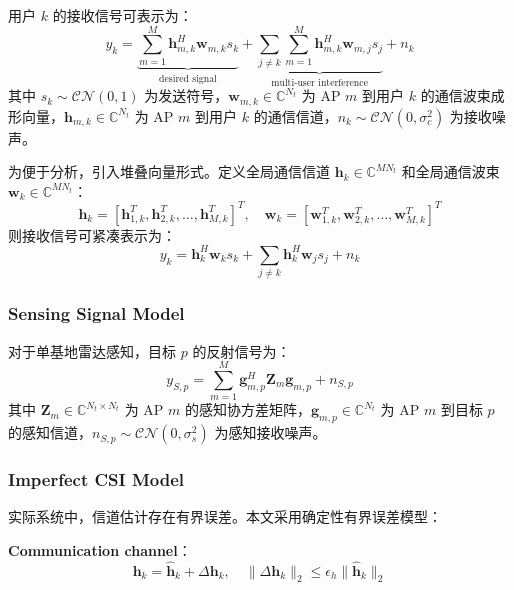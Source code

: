 \documentclass[12pt,a4paper]{article}
\newcommand{\vect}[1]{\mathbf{#1}}
\newcommand{\mat}[1]{\mathbf{#1}}
\newcommand{\norm}[1]{\|#1\|_2}
\begin{document}
用户 $k$ 的接收信号可表示为：
\begin{equation}
y_k = \underbrace{\sum_{m=1}^M \vect{h}_{m,k}^H \vect{w}_{m,k} s_k}_{\text{desired signal}} + \underbrace{\sum_{j \neq k} \sum_{m=1}^M \vect{h}_{m,k}^H \vect{w}_{m,j} s_j}_{\text{multi-user interference}} + n_k
\end{equation}
其中 $s_k \sim \mathcal{CN}(0, 1)$ 为发送符号，$\vect{w}_{m,k} \in \mathbb{C}^{N_t}$ 为 AP $m$ 到用户 $k$ 的通信波束成形向量，$\vect{h}_{m,k} \in \mathbb{C}^{N_t}$ 为 AP $m$ 到用户 $k$ 的通信信道，$n_k \sim \mathcal{CN}(0, \sigma_c^2)$ 为接收噪声。

为便于分析，引入堆叠向量形式。定义全局通信信道 $\vect{h}_k \in \mathbb{C}^{MN_t}$ 和全局通信波束 $\vect{w}_k \in \mathbb{C}^{MN_t}$：
\begin{equation}
\vect{h}_k = [\vect{h}_{1,k}^T, \vect{h}_{2,k}^T, \ldots, \vect{h}_{M,k}^T]^T, \quad
\vect{w}_k = [\vect{w}_{1,k}^T, \vect{w}_{2,k}^T, \ldots, \vect{w}_{M,k}^T]^T
\end{equation}
则接收信号可紧凑表示为：
\begin{equation}
y_k = \vect{h}_k^H \vect{w}_k s_k + \sum_{j \neq k} \vect{h}_k^H \vect{w}_j s_j + n_k
\end{equation}

\subsubsection{Sensing Signal Model}

对于单基地雷达感知，目标 $p$ 的反射信号为：
\begin{equation}
y_{S,p} = \sum_{m=1}^M \vect{g}_{m,p}^H \mat{Z}_m \vect{g}_{m,p} + n_{S,p}
\end{equation}
其中 $\mat{Z}_m \in \mathbb{C}^{N_t \times N_t}$ 为 AP $m$ 的感知协方差矩阵，$\vect{g}_{m,p} \in \mathbb{C}^{N_t}$ 为 AP $m$ 到目标 $p$ 的感知信道，$n_{S,p} \sim \mathcal{CN}(0, \sigma_s^2)$ 为感知接收噪声。

\subsubsection{Imperfect CSI Model}

实际系统中，信道估计存在有界误差。本文采用确定性有界误差模型：

\textbf{Communication channel}：
\begin{equation}
\vect{h}_k = \hat{\vect{h}}_k + \Delta\vect{h}_k, \quad \norm{\Delta\vect{h}_k} \leq \epsilon_h \norm{\hat{\vect{h}}_k}
\end{equation}
\end{document}
